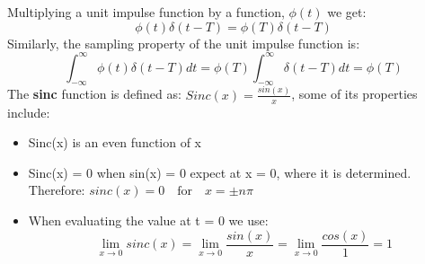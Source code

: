 \documentclass[a4paper,11pt]{article}
\begin{document}
Multiplying a unit impulse function by a function, $\phi (t)$ we get:
$$
    \phi(t)\delta(t-T) = \phi(T)\delta(t-T)
$$
Similarly, the sampling property of the unit impulse function is:
$$
    \int_{-\infty}^{\infty} \phi(t) \delta(t-T)dt = \phi(T) \int_{-\infty}^{\infty} \delta(t-T)dt = \phi(T)
$$
The \textbf{sinc} function is defined as: $Sinc(x) = \frac{sin(x)}{x}$, some of its properties include:
\begin{itemize}
    \item Sinc(x) is an even function of x
    \item Sinc(x) = 0 when sin(x) = 0 expect at x = 0, where it is determined. Therefore: $sinc(x) = 0 \quad \text{for} \quad x = \pm n \pi$
    \item When evaluating the value at t = 0 we use: $$\lim_{x \rightarrow 0} sinc(x) = \lim_{x \rightarrow 0} \frac{sin(x)}{x} = \lim_{x \rightarrow 0} \frac{cos(x)}{1} = 1$$
\end{itemize}
\end{document}
